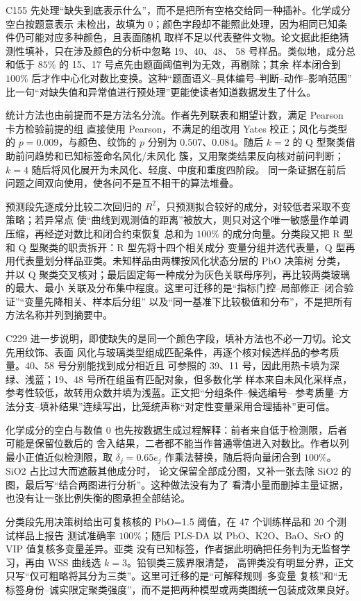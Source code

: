 C155 先处理“缺失到底表示什么”，而不是把所有空格交给同一种插补。化学成分空白按题意表示
未检出，故填为 0；颜色字段却不能照此处理，因为相同已知条件仍可能对应多种颜色，且表面随机
取样不足以代表整件文物。论文据此拒绝猜测性填补，只在涉及颜色的分析中忽略 19、40、48、
58 号样品。类似地，成分总和低于 $85\%$ 的 15、17 号点先由题面阈值判为无效，再剔除；其余
样本闭合到 $100\%$ 后才作中心化对数比变换。这种“题面语义--具体编号--判断--动作--影响范围”
比一句“对缺失值和异常值进行预处理”更能使读者知道数据发生了什么。

统计方法也由前提而不是方法名分流。作者先列联表和期望计数，满足 Pearson 卡方检验前提的组
直接使用 Pearson，不满足的组改用 Yates 校正；风化与类型的 $p=0.009$，与颜色、纹饰的
$p$ 分别为 $0.507$、$0.084$。随后 $k=2$ 的 Q 型聚类借助前问趋势和已知标签命名风化/未风化
簇，又用聚类结果反向核对前问判断；$k=4$ 随后将风化展开为未风化、轻度、中度和重度四阶段。
同一条证据在前后问题之间双向使用，使各问不是互不相干的算法堆叠。

预测段先逐成分比较二次回归的 $R^2$，只预测拟合较好的成分，对较低者采取不变策略；若异常点
使“曲线到观测值的距离”被放大，则只对这个唯一敏感量作单调压缩，再经逆对数比和闭合约束恢复
总和为 $100\%$ 的成分向量。分类段又把 R 型和 Q 型聚类的职责拆开：R 型先将十四个相关成分
变量分组并选代表量，Q 型再用代表量划分样品亚类。未知样品由两棵按风化状态分层的 PbO 决策树
分类，并以 Q 聚类交叉核对；最后固定每一种成分为灰色关联母序列，再比较两类玻璃的最大、最小
关联及分布集中程度。这里可迁移的是“指标门控--局部修正--闭合验证”“变量先降相关、样本后分组”
以及“同一基准下比较极值和分布”，不是把所有方法名称并列到摘要中。

C229 进一步说明，即使缺失的是同一个颜色字段，填补方法也不必一刀切。论文先用纹饰、表面
风化与玻璃类型组成匹配条件，再逐个核对候选样品的参考质量。40、58 号分别能找到成分相近且
可参照的 39、11 号，因此用热卡填为深绿、浅蓝；19、48 号所在组虽有匹配对象，但多数化学
样本来自未风化采样点，参考性较低，故转用众数并填为浅蓝。正文把“分组条件--候选编号--
参考质量--方法分支--填补结果”连续写出，比笼统声称“对定性变量采用合理插补”更可信。

化学成分的空白与数值 0 也先按数据生成过程解释：前者来自低于检测限，后者可能是保留位数后的
舍入结果，二者都不能当作普通零值进入对数比。作者以列最小正值近似检测限，取
$\delta_j=0.65e_j$ 作乘法替换，随后将向量闭合到 $100\%$。SiO2 占比过大而遮蔽其他成分时，
论文保留全部成分图，又补一张去除 SiO2 的图，最后写“结合两图进行分析”。这种做法没有为了
看清小量而删掉主量证据，也没有让一张比例失衡的图承担全部结论。

分类段先用决策树给出可复核核的 PbO=1.5 阈值，在 47 个训练样品和 20 个测试样品上报告
测试准确率 $100\%$；随后 PLS-DA 以 PbO、K2O、BaO、SrO 的 VIP 值复核多变量差异。亚类
没有已知标签，作者据此明确把任务判为无监督学习，再由 WSS 曲线选 $k=3$。铅钡类三簇界限清楚，
高钾类没有明显分界，正文只写“仅可粗略将其分为三类”。这里可迁移的是“可解释规则--多变量
复核”和“无标签身份--诚实限定聚类强度”，而不是把两种模型或两类图统一包装成效果良好。

